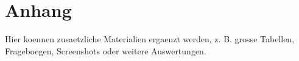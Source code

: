 \chapter{Anhang}

Hier koennen zusaetzliche Materialien ergaenzt werden, z. B. grosse Tabellen,
Frageboegen, Screenshots oder weitere Auswertungen.
